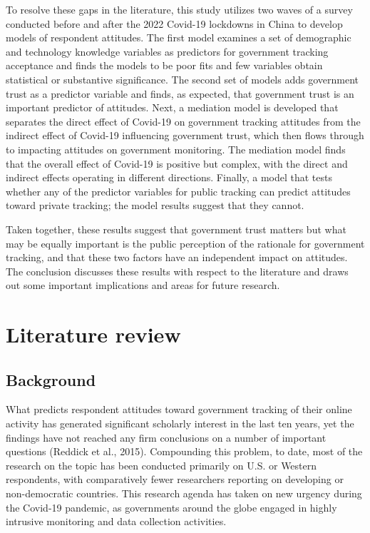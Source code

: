\documentclass[
  letterpaper,
  DIV=11,
  numbers=noendperiod]{scrartcl}
\begin{document}
To resolve these gaps in the literature, this study utilizes two waves
of a survey conducted before and after the 2022 Covid-19 lockdowns in
China to develop models of respondent attitudes. The first model
examines a set of demographic and technology knowledge variables as
predictors for government tracking acceptance and finds the models to be
poor fits and few variables obtain statistical or substantive
significance. The second set of models adds government trust as a
predictor variable and finds, as expected, that government trust is an
important predictor of attitudes. Next, a mediation model is developed
that separates the direct effect of Covid-19 on government tracking
attitudes from the indirect effect of Covid-19 influencing government
trust, which then flows through to impacting attitudes on government
monitoring. The mediation model finds that the overall effect of
Covid-19 is positive but complex, with the direct and indirect effects
operating in different directions. Finally, a model that tests whether
any of the predictor variables for public tracking can predict attitudes
toward private tracking; the model results suggest that they cannot.

Taken together, these results suggest that government trust matters but
what may be equally important is the public perception of the rationale
for government tracking, and that these two factors have an independent
impact on attitudes. The conclusion discusses these results with respect
to the literature and draws out some important implications and areas
for future research.

\section{Literature review}\label{sec-litreview}

\subsection{Background}\label{background}

What predicts respondent attitudes toward government tracking of their
online activity has generated significant scholarly interest in the last
ten years, yet the findings have not reached any firm conclusions on a
number of important questions (Reddick et al., 2015). Compounding this
problem, to date, most of the research on the topic has been conducted
primarily on U.S. or Western respondents, with comparatively fewer
researchers reporting on developing or non-democratic countries. This
research agenda has taken on new urgency during the Covid-19 pandemic,
as governments around the globe engaged in highly intrusive monitoring
and data collection activities.
\end{document}
